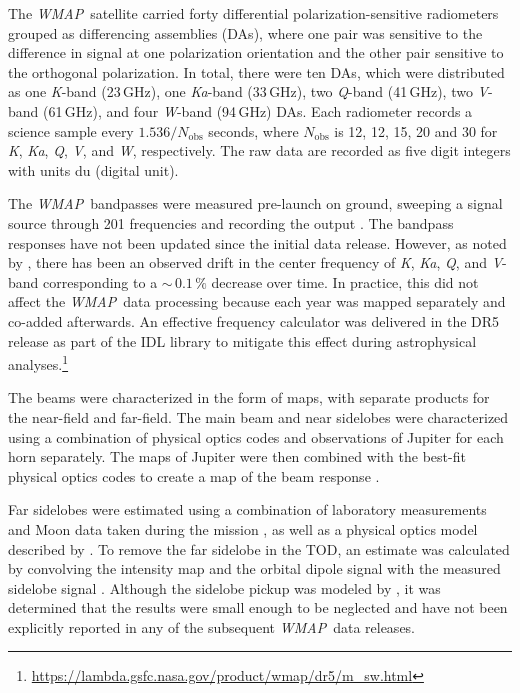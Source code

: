 \documentclass[twocolumn]{../../common/aa}
\def\WMAP{\emph{WMAP}}
\newcommand{\K}[0]{\textit K}
\newcommand{\Ka}[0]{\textit{Ka}}
\newcommand{\Q}[0]{\textit Q}
\newcommand{\V}[0]{\textit V}
\newcommand{\W}[0]{\textit W}
\begin{document}
The \WMAP\ satellite carried forty differential polarization-sensitive
radiometers grouped as differencing assemblies (DAs), where one pair
was sensitive to the difference in signal at one polarization
orientation and the other pair sensitive to the orthogonal
polarization. In total, there were ten DAs, which were distributed as
one \K-band (23\,GHz), one \Ka-band (33\,GHz), two \Q-band (41\,GHz),
two \V-band (61\,GHz), and four \W-band (94\,GHz) DAs. Each radiometer records a science sample every $1.536/N_\mathrm{obs}$ seconds, where $N_\mathrm{obs}$ is 12, 12, 15, 20 and 30 for \K, \Ka, \Q, \V, and \W, respectively. The raw data are recorded as five digit integers with units du (digital unit).

The \WMAP\ bandpasses were measured pre-launch on ground, sweeping a signal source through 201 frequencies and recording the output \citep{jarosik2003:MAP}. The bandpass responses have not been updated since the initial data release. However, as noted by \citet{bennett2012}, there has been an observed drift in the center frequency of \K, \Ka, \Q, and \V-band corresponding to a $\sim$$\,0.1\,\%$ decrease over time. In practice, this did not affect the \WMAP\ data processing because each year was mapped separately and co-added afterwards. An effective frequency calculator was delivered in the DR5 release as part of the IDL library to mitigate this effect during astrophysical analyses.\footnote{\url{https://lambda.gsfc.nasa.gov/product/wmap/dr5/m_sw.html}}

The beams were characterized in the form of maps, with separate products for the near-field and far-field. The main beam and near sidelobes were characterized using a combination of physical optics codes and observations of Jupiter for each horn separately. The maps of Jupiter were then combined with the best-fit physical optics codes to create a map of the beam response \citep{hill2009,weiland2010,bennett2012}.

Far sidelobes were estimated using a combination of laboratory measurements and Moon data taken during the mission \citep{barnes2003}, as well as a physical optics model described by \citet{hinshaw2009}. To remove the far sidelobe  in the TOD, an estimate was calculated by convolving the intensity map and the orbital dipole signal with the measured sidelobe signal \citep{jarosik2007}. Although the sidelobe pickup was modeled by \citet{barnes2003}, it was determined that the results were small enough to be neglected and have not been explicitly reported in any of the subsequent \WMAP\ data releases.
\end{document}
